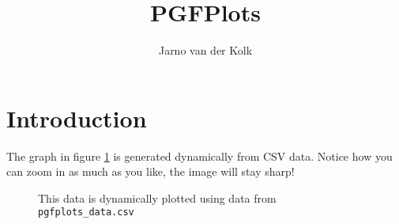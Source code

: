 \documentclass[10pt,letterpaper]{article}
\title{PGFPlots}
\author{Jarno van der Kolk}
\begin{document}
	\maketitle
	\section{Introduction}
	The graph in figure \ref{fig:pgf} is generated dynamically from CSV data. Notice how you can zoom in as much as you like, the image will stay sharp!
	\begin{figure}[h]
		\caption{This data is dynamically plotted using data from \texttt{pgfplots\_data.csv}}
		\label{fig:pgf}
	\end{figure}
\end{document}
